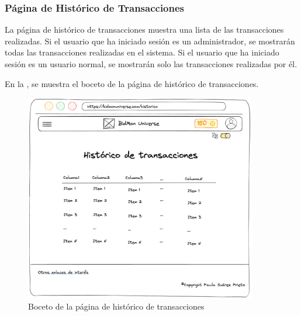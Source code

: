 \subsubsection{Página de Histórico de Transacciones}
La página de histórico de transacciones muestra una lista de las transacciones realizadas.
Si el usuario que ha iniciado sesión es un administrador, se mostrarán todas las transacciones realizadas en el sistema.
Si el usuario que ha iniciado sesión es un usuario normal, se mostrarán solo las transacciones realizadas por él.

En la , se muestra el boceto de la página de histórico de transacciones.
\begin{figure}[H]
    \centering
    \includegraphics[width=0.9\textwidth]{figures/6-Analisis/6-Interfaz/prototipos/historico-transacciones.png}
    \caption{Boceto de la página de histórico de transacciones}
    \label{fig:p_transactions}
    \hypertarget{fig:p_transactions}{}
\end{figure}